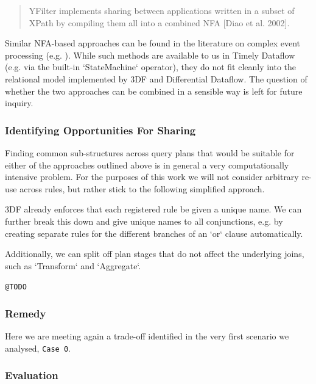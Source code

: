 \documentclass[../catalog.tex]{subfiles}
\begin{document}
\begin{quote}
YFilter implements sharing between applications written in a subset of
XPath by compiling them all into a combined NFA [Diao et al. 2002].
\end{quote}

Similar NFA-based approaches can be found in the literature on complex
event processing (e.g. \cite{agrawal2008}). While such methods are
available to us in Timely Dataflow (e.g. via the built-in
`StateMachine` operator), they do not fit cleanly into the relational
model implemented by 3DF and Differential Dataflow. The question of
whether the two approaches can be combined in a sensible way is left
for future inquiry.

\subsubsection{Identifying Opportunities For Sharing}

Finding common sub-structures across query plans that would be
suitable for either of the approaches outlined above is in general a
very computationally intensive problem. For the purposes of this work
we will not consider arbitrary re-use across rules, but rather stick
to the following simplified approach.

3DF already enforces that each registered rule be given a unique
name. We can further break this down and give unique names to all
conjunctions, e.g. by creating separate rules for the different
branches of an `or` clause automatically.

Additionally, we can split off plan stages that do not affect the
underlying joins, such as `Transform` and `Aggregate`.

\texttt{@TODO}

\subsubsection{Remedy}

Here we are meeting again a trade-off identified in the very first
scenario we analysed, \texttt{Case 0}.

\subsubsection{Evaluation}
\end{document}
